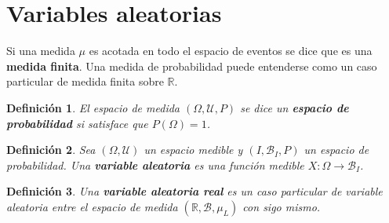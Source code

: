 \documentclass[12pt,letterpaper,draft]{book}
\newtheorem{definicion}{Definición}[chapter]
\newtheorem{proposicion}[teorema]{Proposición}
\newcommand{\R}{\mathbb{R}}
\begin{document}


\section{Variables aleatorias}

Si una medida $\mu$ es acotada en todo el espacio de eventos se dice que es una \textbf{medida finita}.%
%
Una medida de probabilidad puede entenderse como un caso particular de medida finita sobre $\R$.

\begin{definicion}
El espacio de medida $(\Omega,\mathcal{U},P)$ se dice un \textbf{espacio de probabilidad} si satisface que $P(\Omega) = 1$.
\end{definicion}


\begin{definicion}
Sea $(\Omega,\mathcal{U})$ un espacio medible y $(I,\mathcal{B}_I,P)$ un espacio de probabilidad. Una \textbf{variable aleatoria} es una función medible $X: \Omega \rightarrow \mathcal{B}_I$.
\end{definicion}

\begin{definicion}
Una \textbf{variable aleatoria real} es un caso particular de variable aleatoria entre el espacio de medida $(\R,\mathcal{B},\mu_L)$ con sigo mismo.
\end{definicion}
\end{document}
